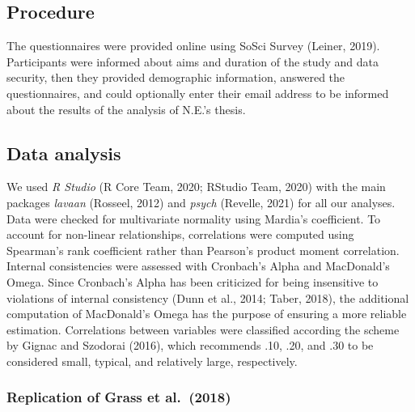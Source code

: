 \documentclass[
  english,
  man,floatsintext]{apa6}
\begin{document}
\hypertarget{procedure}{%
\subsection{Procedure}\label{procedure}}

The questionnaires were provided online using SoSci Survey (Leiner, 2019).
Participants were informed about aims and duration of the study and data security, then they provided demographic information, answered the questionnaires, and could optionally enter their email address to be informed about the results of the analysis of N.E.'s thesis.

\hypertarget{data-analysis}{%
\subsection{Data analysis}\label{data-analysis}}

We used \emph{R Studio} (R Core Team, 2020; RStudio Team, 2020) with the main packages \emph{lavaan} (Rosseel, 2012) and \emph{psych} (Revelle, 2021) for all our analyses.
Data were checked for multivariate normality using Mardia's coefficient.
To account for non-linear relationships, correlations were computed using Spearman's rank coefficient rather than Pearson's product moment correlation.
Internal consistencies were assessed with Cronbach's Alpha and MacDonald's Omega.
Since Cronbach's Alpha has been criticized for being insensitive to violations of internal consistency (Dunn et al., 2014; Taber, 2018), the additional computation of MacDonald's Omega has the purpose of ensuring a more reliable estimation.
Correlations between variables were classified according the scheme by Gignac and Szodorai (2016), which recommends .10, .20, and .30 to be considered small, typical, and relatively large, respectively.

\hypertarget{replication-of-grass-et-al.-2018}{%
\subsubsection{Replication of Grass et al.~(2018)}\label{replication-of-grass-et-al.-2018}}
\end{document}
